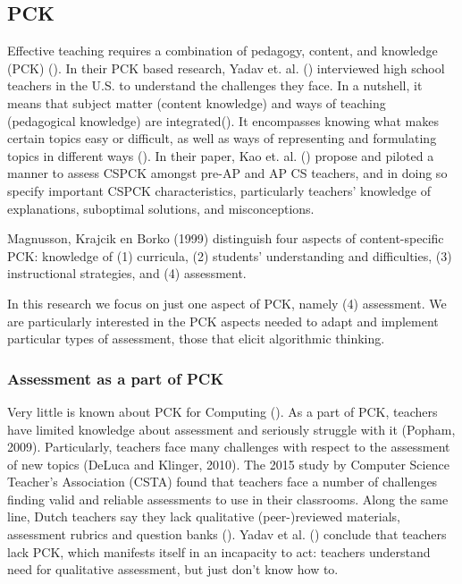 \subsection*{PCK}

Effective teaching requires a combination of pedagogy, content, and knowledge (PCK) (\cite{shulman1986pedagogical}).  In their PCK based research, Yadav et. al. (\cite{Yadav2016}) interviewed high school teachers in the U.S. to understand the challenges they face.  In a nutshell, it means that subject matter (content knowledge) and ways of teaching (pedagogical knowledge) are integrated(\cite{Yadav2016}). It encompasses knowing what makes certain topics easy or difficult, as well as ways of representing and formulating topics in different ways (\cite{shulman1986pedagogical}). In their paper, Kao et. al. (\cite{Kao2018}) propose and piloted a manner to assess CSPCK amongst pre-AP and AP CS teachers, and in doing so specify important CSPCK characteristics, particularly teachers' knowledge of explanations, suboptimal solutions, and misconceptions.

Magnusson, Krajcik en Borko (1999) distinguish four aspects of content-specific PCK: knowledge of
(1) curricula, (2) students' understanding and difficulties, (3) instructional strategies, and (4) assessment.


In this research we focus on just one aspect of PCK, namely (4) assessment. We are particularly interested in the PCK aspects needed to adapt and implement particular types of assessment, those that elicit algorithmic thinking.


\subsubsection*{Assessment as a part of PCK}
Very little is known about PCK for Computing (\cite{Yadav2016}). As a part of PCK, teachers have limited knowledge about assessment and seriously struggle with it (Popham, 2009). Particularly, teachers face many challenges with respect to the assessment of new topics (DeLuca and Klinger, 2010). The 2015 study by Computer Science Teacher's Association (CSTA) found that teachers face a number of challenges finding valid and reliable assessments to use in their classrooms. Along the same line, Dutch teachers say they lack qualitative (peer-)reviewed materials, assessment rubrics and question banks (\cite{tolboom2014informatica}). Yadav et al. (\cite{Yadav2015}) conclude that teachers lack PCK, which manifests itself in an incapacity to act: teachers understand need for qualitative assessment, but just don't know how to.

